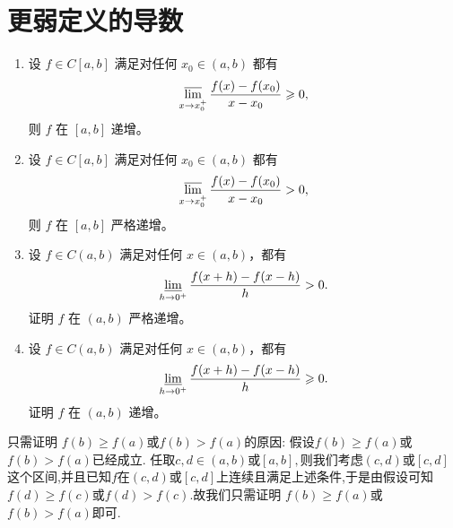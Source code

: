 \documentclass[../../main.tex]{subfiles}
\begin{document}
\section{更弱定义的导数}

\begin{theorem}[最弱递增条件]\label{theorem:最弱递增条件}
\begin{enumerate}
\item 设 \(f\in C[a,b]\) 满足对任何 \(x_0\in (a,b)\) 都有
\begin{align*}
\varlimsup_{x\rightarrow x_0^+}\frac{f(x)-f(x_0)}{x - x_0}\geqslant 0,
\end{align*}
则 \(f\) 在 \([a,b]\) 递增。

\item 设 \(f\in C[a,b]\) 满足对任何 \(x_0\in (a,b)\) 都有
\begin{align}
\varlimsup_{x\rightarrow x_0^+}\frac{f(x)-f(x_0)}{x - x_0}> 0,\label{equation--13.100}
\end{align}
则 \(f\) 在 \([a,b]\) 严格递增。

\item 设 \(f\in C(a,b)\) 满足对任何 \(x\in (a,b)\)，都有
\begin{align*}
\varliminf_{h\rightarrow 0^+}\frac{f(x + h)-f(x - h)}{h}> 0.
\end{align*}
证明 \(f\) 在 \((a,b)\) 严格递增。

\item 设 \(f\in C(a,b)\) 满足对任何 \(x\in (a,b)\)，都有
\begin{align*}
\varliminf_{h\rightarrow 0^+}\frac{f(x + h)-f(x - h)}{h}\geqslant 0.
\end{align*}
证明 \(f\) 在 \((a,b)\) 递增。 
\end{enumerate}
\end{theorem}
\begin{remark}
只需证明 \(f(b) \geqslant  f(a)\)或\(f(b)>f(a)\)的原因:
假设\(f(b) \geqslant  f(a)\)或\(f(b)>f(a)\)已经成立.
任取$c,d\in (a,b)$或$[a,b],$则我们考虑$(c,d)$或$[c,d]$这个区间,并且已知$f$在$(c,d)$或$[c,d]$上连续且满足上述条件,于是由假设可知\(f(d) \geqslant  f(c)\)或\(f(d)>f(c)\).故我们只需证明 \(f(b) \geqslant  f(a)\)或\(f(b)>f(a)\)即可.
\end{remark}
\end{document}
